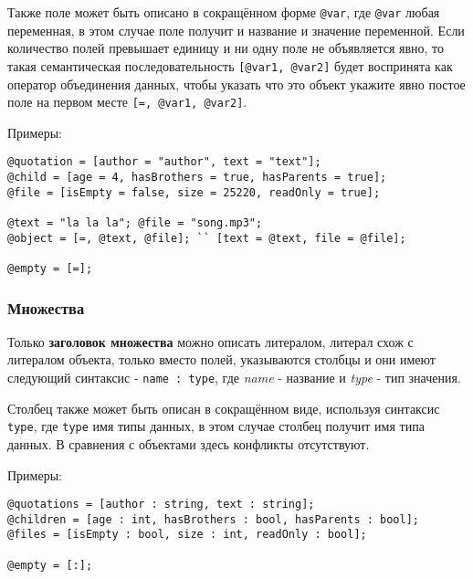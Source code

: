 Также поле может быть описано в сокращённом форме \texttt{@var}, где \texttt{@var} любая переменная, в этом случае поле получит и название и значение переменной. Если количество полей превышает единицу и ни одну поле не объявляется явно, то такая семантическая последовательность \texttt{[@var1, @var2]} будет воспринята как оператор объединения данных, чтобы указать что это объект укажите явно постое поле на первом месте \texttt{[=, @var1, @var2]}.

\noindent Примеры:
\begin{verbatim}
@quotation = [author = "author", text = "text"];
@child = [age = 4, hasBrothers = true, hasParents = true];
@file = [isEmpty = false, size = 25220, readOnly = true];

@text = "la la la"; @file = "song.mp3";
@object = [=, @text, @file]; `` [text = @text, file = @file];

@empty = [=];
\end{verbatim}

\subsubsection{Множества}

Только {\bf заголовок множества} можно описать литералом, литерал схож с литералом объекта, только вместо полей, указываются столбцы и они имеют следующий синтаксис - \texttt{name : type}, где  {\it name} - название и {\it type} - тип значения.

Столбец также может быть описан в сокращённом виде, используя синтаксис \texttt{type}, где \texttt{type} имя типы данных, в этом случае столбец получит имя типа данных. В сравнения с объектами здесь конфликты отсутствуют.

\noindent Примеры:
\begin{verbatim}
@quotations = [author : string, text : string];
@children = [age : int, hasBrothers : bool, hasParents : bool];
@files = [isEmpty : bool, size : int, readOnly : bool];

@empty = [:];
\end{verbatim}

